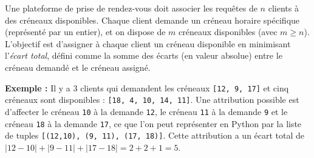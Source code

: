 \documentclass[11pt,a4paper]{article}
\begin{document}
\begin{Exercise}[title={Planification de rendez-vous optimale}]
    
    Une plateforme de prise de rendez-vous doit associer les requêtes de $n$ clients à des créneaux disponibles. Chaque client demande un créneau horaire spécifique (représenté par un entier), et on dispose de $m$ créneaux disponibles (avec $m \geqslant n$). L'objectif est d'assigner à chaque client un créneau disponible en minimisant l'\textit{écart total}, défini comme la somme des écarts (en valeur absolue) entre le créneau demandé et le créneau assigné.
    
    \textbf{Exemple :} Il y a 3 clients qui demandent les créneaux {\tt [12, 9, 17]} et cinq créneaux sont disponibles : {\tt [18, 4, 10, 14, 11]}. Une attribution possible est d'affecter le créneau {\tt 10} à la demande {\tt 12}, le créneau {\tt 11} à la demande {\tt 9} et le créneau {\tt 18} à la demande {\tt 17}, ce que l'on peut représenter en Python par la liste de tuples {\tt [(12,10), (9, 11), (17, 18)]}. Cette attribution a un écart total de $|12-10| + |9-11| + |17-18| = 2+2+1 = 5$.


\end{Exercise}
\end{document}
